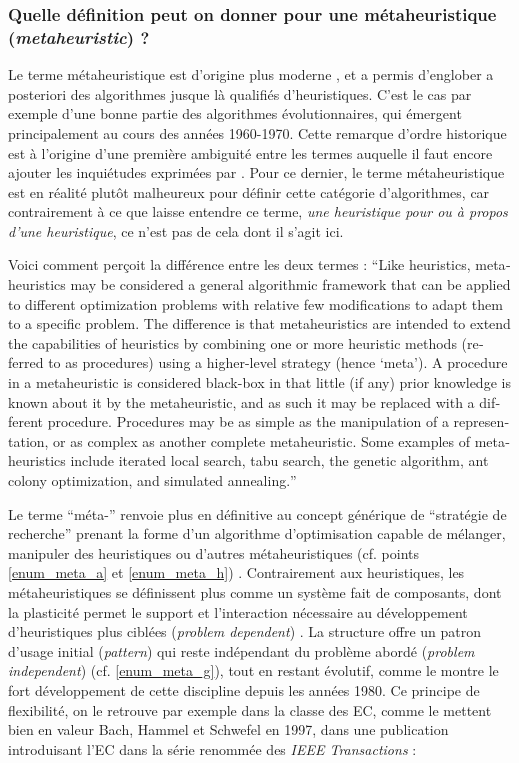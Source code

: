 \subsubsection{Quelle définition peut on donner pour une métaheuristique (\textit{metaheuristic}) ?}
\label{ssec:metaheuristique}

Le terme métaheuristique est d'origine plus moderne \autocite{Glover1986}, et a permis d'englober a posteriori des algorithmes jusque là qualifiés d'heuristiques. C'est le cas par exemple d'une bonne partie des algorithmes évolutionnaires, qui émergent principalement au cours des années 1960-1970. Cette remarque d'ordre historique est à l'origine d'une première ambiguité entre les termes auquelle il faut encore ajouter les inquiétudes exprimées par \textcite{Luke2013}. Pour ce dernier, le terme métaheuristique est en réalité plutôt malheureux pour définir cette catégorie d'algorithmes, car contrairement à ce que laisse entendre ce terme, \textit{une heuristique pour ou à propos d'une heuristique}, ce n'est pas de cela dont il s'agit ici.

Voici comment \textcite[8]{Brownlee2012} perçoit la différence entre les deux termes : \foreignquote{english}{Like heuristics, metaheuristics may be considered a general algorithmic framework that can be applied to different optimization problems with relative few modifications to adapt them to a specific problem. The difference is that metaheuristics are intended to extend the capabilities of heuristics by combining one or more heuristic methods (referred to as procedures) using a higher-level strategy (hence ‘meta’). A procedure in a metaheuristic is considered black-box in that little (if any) prior knowledge is known about it by the metaheuristic, and as such it may be replaced with a different procedure. Procedures may be as simple as the manipulation of a representation, or as complex as another complete metaheuristic. Some examples of metaheuristics include iterated local search, tabu search, the genetic algorithm, ant colony optimization, and simulated annealing.}

Le terme \enquote{méta-} renvoie plus en définitive au concept générique de \enquote{stratégie de recherche} prenant la forme d'un algorithme d'optimisation capable de mélanger, manipuler des heuristiques ou d'autres métaheuristiques (cf. points \ref{enum_meta_a} et \ref{enum_meta_h}) . Contrairement aux heuristiques, les métaheuristiques se définissent plus comme un système fait de composants, dont la plasticité permet le support et l'interaction nécessaire au développement d'heuristiques plus ciblées (\textit{problem dependent}) . La structure offre un patron d'usage initial (\textit{pattern}) qui reste indépendant du problème abordé (\textit{problem independent}) (cf. \ref{enum_meta_g}), tout en restant évolutif, comme le montre le fort développement de cette discipline depuis les années 1980. Ce principe de flexibilité, on le retrouve par exemple dans la classe des EC, comme le mettent bien en valeur Bach, Hammel et Schwefel en 1997, dans une publication introduisant l'EC dans la série renommée des \textit{IEEE Transactions} :

